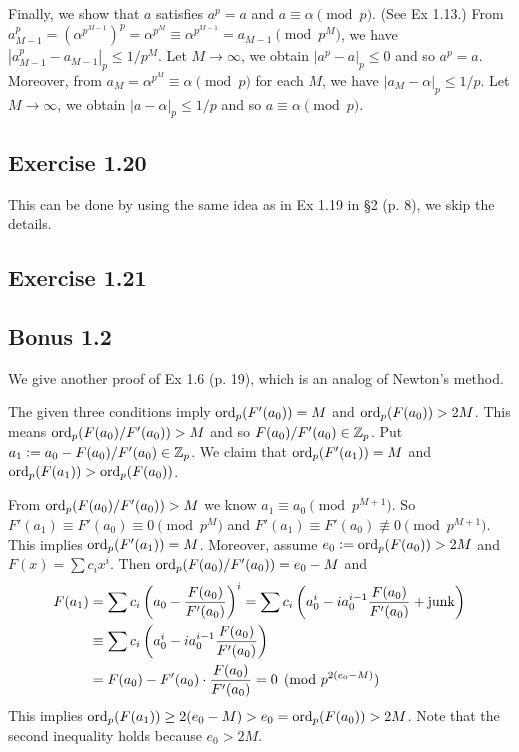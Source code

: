 \documentclass[../Koblitz.tex]{subfiles}
\begin{document}
Finally, we show that $a$ satisfies $a^p=a$ and $a\equiv\alpha\pmod{p}$. (See Ex 1.13.) From $a_{M-1}^p = (\alpha^{p^{M-1}})^p= \alpha^{p^M} \equiv \alpha^{p^{M-1}} = a_{M-1} \pmod{p^M}$, we have $|a_{M-1}^p-a_{M-1}|_p\leq 1/p^M$. Let $M\to\infty$, we obtain $|a^p-a|_p\leq 0$ and so $a^p=a$. Moreover, from $a_M = \alpha^{p^M} \equiv\alpha\pmod{p}$ for each $M$, we have $|a_M-\alpha|_p\leq 1/p$. Let $M\to\infty$, we obtain $|a-\alpha|_p\leq 1/p$ and so $a\equiv\alpha\pmod{p}$.

\subsection*{Exercise 1.20}

This can be done by using the same idea as in Ex 1.19 in \S2 (p. 8), we skip the details.

\subsection*{Exercise 1.21}

\subsection*{Bonus 1.2} \label{Bonus 1.2}

We give another proof of Ex 1.6 (p. 19), which is an analog of Newton's method.

The given three conditions imply $\operatorname{ord}_p(F'(a_0))=M$ and $\operatorname{ord}_p(F(a_0))>2M$. This means $\operatorname{ord}_p(F(a_0)/F'(a_0))>M$ and so $F(a_0)/F'(a_0)\in\mathbb{Z}_p$. Put $a_1:=a_0-F(a_0)/F'(a_0)\in\mathbb{Z}_p$. We claim that $\operatorname{ord}_p(F'(a_1))=M$ and $\operatorname{ord}_p(F(a_1))>\operatorname{ord}_p(F(a_0))$.

From $\operatorname{ord}_p(F(a_0)/F'(a_0))>M$ we know $a_1\equiv a_0 \pmod{p^{M+1}}$. So $F'(a_1)\equiv F'(a_0)\equiv0\pmod{p^M}$ and $F'(a_1)\equiv F'(a_0)\not\equiv0\pmod{p^{M+1}}$. This implies $\operatorname{ord}_p(F'(a_1))=M$. Moreover, assume $e_0:=\operatorname{ord}_p(F(a_0))>2M$ and $F(x)=\sum c_ix^i$. Then $\operatorname{ord}_p(F(a_0)/F'(a_0))=e_0-M$ and
\begin{align*}
F(a_1) &= \sum c_i\left(a_0-\frac{F(a_0)}{F'(a_0)}\right)^i = \sum c_i\left(a_0^i - ia_0^{i-1}\frac{F(a_0)}{F'(a_0)}+\operatorname{junk}\right) \\
&\equiv \sum c_i\left(a_0^i - ia_0^{i-1}\frac{F(a_0)}{F'(a_0)}\right) \\
&= F(a_0) - F'(a_0)\cdot\frac{F(a_0)}{F'(a_0)} = 0 \pmod{p^{2(e_0-M)}}
\end{align*}
This implies $\operatorname{ord}_p(F(a_1)) \geq 2(e_0-M) > e_0 = \operatorname{ord}_p(F(a_0)) > 2M$. Note that the second inequality holds because $e_0>2M$.
\end{document}
